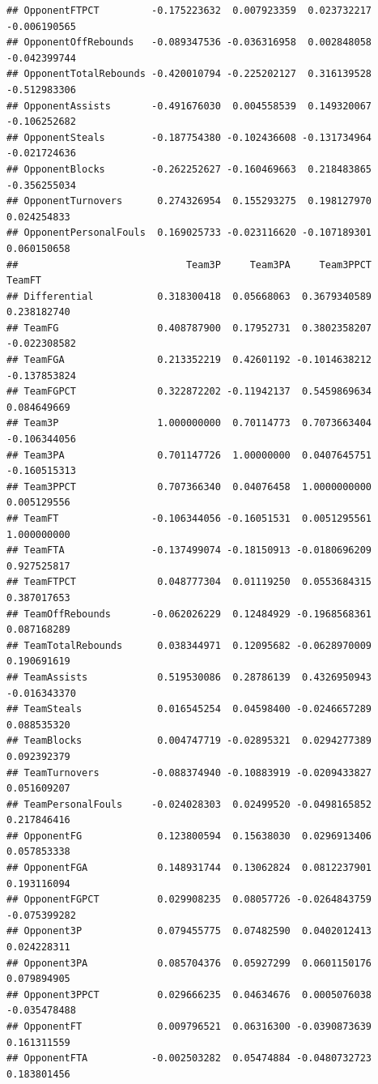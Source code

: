 \documentclass[
]{book}
\begin{document}
\begin{verbatim}
## OpponentFTPCT         -0.175223632  0.007923359  0.023732217 -0.006190565
## OpponentOffRebounds   -0.089347536 -0.036316958  0.002848058 -0.042399744
## OpponentTotalRebounds -0.420010794 -0.225202127  0.316139528 -0.512983306
## OpponentAssists       -0.491676030  0.004558539  0.149320067 -0.106252682
## OpponentSteals        -0.187754380 -0.102436608 -0.131734964 -0.021724636
## OpponentBlocks        -0.262252627 -0.160469663  0.218483865 -0.356255034
## OpponentTurnovers      0.274326954  0.155293275  0.198127970  0.024254833
## OpponentPersonalFouls  0.169025733 -0.023116620 -0.107189301  0.060150658
##                             Team3P     Team3PA     Team3PPCT       TeamFT
## Differential           0.318300418  0.05668063  0.3679340589  0.238182740
## TeamFG                 0.408787900  0.17952731  0.3802358207 -0.022308582
## TeamFGA                0.213352219  0.42601192 -0.1014638212 -0.137853824
## TeamFGPCT              0.322872202 -0.11942137  0.5459869634  0.084649669
## Team3P                 1.000000000  0.70114773  0.7073663404 -0.106344056
## Team3PA                0.701147726  1.00000000  0.0407645751 -0.160515313
## Team3PPCT              0.707366340  0.04076458  1.0000000000  0.005129556
## TeamFT                -0.106344056 -0.16051531  0.0051295561  1.000000000
## TeamFTA               -0.137499074 -0.18150913 -0.0180696209  0.927525817
## TeamFTPCT              0.048777304  0.01119250  0.0553684315  0.387017653
## TeamOffRebounds       -0.062026229  0.12484929 -0.1968568361  0.087168289
## TeamTotalRebounds      0.038344971  0.12095682 -0.0628970009  0.190691619
## TeamAssists            0.519530086  0.28786139  0.4326950943 -0.016343370
## TeamSteals             0.016545254  0.04598400 -0.0246657289  0.088535320
## TeamBlocks             0.004747719 -0.02895321  0.0294277389  0.092392379
## TeamTurnovers         -0.088374940 -0.10883919 -0.0209433827  0.051609207
## TeamPersonalFouls     -0.024028303  0.02499520 -0.0498165852  0.217846416
## OpponentFG             0.123800594  0.15638030  0.0296913406  0.057853338
## OpponentFGA            0.148931744  0.13062824  0.0812237901  0.193116094
## OpponentFGPCT          0.029908235  0.08057726 -0.0264843759 -0.075399282
## Opponent3P             0.079455775  0.07482590  0.0402012413  0.024228311
## Opponent3PA            0.085704376  0.05927299  0.0601150176  0.079894905
## Opponent3PPCT          0.029666235  0.04634676  0.0005076038 -0.035478488
## OpponentFT             0.009796521  0.06316300 -0.0390873639  0.161311559
## OpponentFTA           -0.002503282  0.05474884 -0.0480732723  0.183801456

\end{verbatim}
\end{document}
